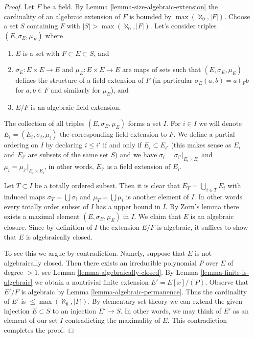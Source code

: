 \begin{proof}
Let $F$ be a field. By Lemma \ref{lemma-size-algebraic-extension} the
cardinality of an algebraic extension of $F$ is bounded by
$\max(\aleph_0, |F|)$. Choose a set $S$ containing $F$ with
$|S| > \max(\aleph_0, |F|)$. Let's consider triples
$(E, \sigma_E, \mu_E)$ where
\begin{enumerate}
\item $E$ is a set with $F \subset E \subset S$, and
\item $\sigma_E : E \times E \to E$ and $\mu_E : E \times E \to E$
are maps of sets such that $(E, \sigma_E, \mu_E)$ defines the structure
of a field extension of $F$ (in particular $\sigma_E(a, b) = a +_F b$
for $a, b \in F$ and similarly for $\mu_E$), and
\item $E/F$ is an algebraic field extension.
\end{enumerate}
The collection of all triples $(E, \sigma_E, \mu_E)$ forms a set $I$.
For $i \in I$ we will denote $E_i = (E_i, \sigma_i, \mu_i)$ the
corresponding field extension to $F$. We define a partial ordering on
$I$ by declaring $i \leq i'$ if and only if $E_i \subset E_{i'}$
(this makes sense as $E_i$ and $E_{i'}$ are subsets of the same set $S$)
and we have $\sigma_i = \sigma_{i'}|_{E_i \times E_i}$ and
$\mu_i = \mu_{i'}|_{E_i \times E_i}$, in other words, $E_{i'}$ is a field
extension of $E_i$.

\medskip\noindent
Let $T \subset I$ be a totally ordered subset. Then it is clear that
$E_T = \bigcup_{i \in T} E_i$ with induced maps $\sigma_T = \bigcup \sigma_i$
and $\mu_T = \bigcup \mu_i$ is another element of $I$. In other words
every totally order subset of $I$ has a upper bound in $I$. By Zorn's lemma
there exists a maximal element $(E, \sigma_E, \mu_E)$ in $I$. We claim that
$E$ is an algebraic closure. Since by definition of $I$ the extension
$E/F$ is algebraic, it suffices to show that $E$ is algebraically closed.

\medskip\noindent
To see this we argue by contradiction. Namely, suppose that $E$ is not
algebraically closed. Then there exists an irreducible polynomial
$P$ over $E$ of degree $> 1$, see Lemma \ref{lemma-algebraically-closed}.
By Lemma \ref{lemma-finite-is-algebraic} we obtain a nontrivial finite
extension $E' = E[x]/(P)$. Observe that $E'/F$ is algebraic by
Lemma \ref{lemma-algebraic-permanence}.
Thus the cardinality of $E'$ is $\leq \max(\aleph_0, |F|)$.
By elementary set theory we can extend the given injection
$E \subset S$ to an injection $E' \to S$. In other words, we may
think of $E'$ as an element of our set $I$ contradicting the
maximality of $E$. This contradiction completes the proof.
\end{proof}

